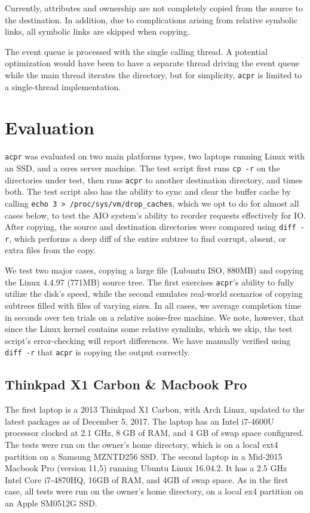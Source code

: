 \documentclass[11pt]{article}
\begin{document}
Currently, attributes and ownership are not completely copied from the source to
the destination. In addition, due to complications arising from relative
symbolic links, all symbolic links are skipped when copying.

The event queue is processed with the single calling thread. A potential
optimization would have been to have a separate thread driving the event queue
while the main thread iterates the directory, but for simplicity, \texttt{acpr}
is limited to a single-thread implementation.

\section{Evaluation} \label{sec:eval}

\texttt{acpr} was evaluated on two main platforms types, two laptops running
Linux with an SSD, and a csres server machine. The test script first runs
\texttt{cp -r} on the directories under test, then runs \texttt{acpr} to another
destination directory, and times both. The test script also has the ability to
sync and clear the buffer cache by calling \texttt{echo 3 >
/proc/sys/vm/drop\_caches}, which we opt to do for almost all cases below, to
test the AIO system's ability to reorder requests effectively for IO. After
copying, the source and destination directories were compared using
\texttt{diff -r}, which performs a deep diff of the entire subtree to find
corrupt, absent, or extra files from the copy.

We test two major cases, copying a large file (Lubuntu ISO, 880MB) and copying
the Linux 4.4.97 (771MB) source tree. The first exercises \texttt{acpr}'s
ability to fully utilize the disk's speed, while the second emulates real-world
scenarios of copying subtrees filled with files of varying sizes. In all cases,
we average completion time in seconds over ten trials on a relative noise-free
machine. We note, however, that since the Linux kernel contains some relative
symlinks, which we skip, the test script's error-checking will report
differences. We have manually verified using \texttt{diff -r} that \texttt{acpr}
is copying the output correctly. 

\subsection{Thinkpad X1 Carbon \& Macbook Pro} \label{subsec:laptops}

The first laptop is a 2013 Thinkpad X1 Carbon, with Arch Linux, updated to the
latest packages as of December 5, 2017. The laptop has an Intel i7-4600U
processor clocked at 2.1 GHz, 8 GB of RAM, and 4 GB of swap space configured.
The tests were run on the owner's home directory, which is on a local ext4
partition on a Samsung MZNTD256 SSD. The second laptop in a Mid-2015 Macbook Pro
(version 11,5) running Ubuntu Linux 16.04.2. It has a 2.5 GHz Intel Core
i7-4870HQ, 16GB of RAM, and 4GB of swap space. As in the first case, all tests
were run on the owner's home directory, on a local ex4 partition on an Apple
SM0512G SSD.
\end{document}
